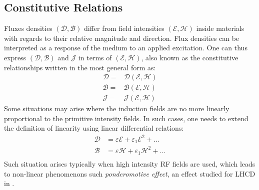 \subsection{Constitutive Relations}
Fluxes densities $(\boldsymbol{\mathcal{D}}, \boldsymbol{\mathcal{B}})$ differ from field intensities $(\boldsymbol{\mathcal{E}}, \boldsymbol{\mathcal{H}})$ inside materials with regards to their relative magnitude and direction. Flux densities can be interpreted  as a response of the medium to an applied excitation. One can thus express $(\boldsymbol{\mathcal{D}},\boldsymbol{\mathcal{B}})$ and $\boldsymbol{\mathcal{J}}$ in terms of $(\boldsymbol{\mathcal{E}},\boldsymbol{\mathcal{H}})$, also known as the constitutive relationships written in the most general form as:
\begin{subequations}
	\begin{align}
		\boldsymbol{\mathcal{D}} =& \boldsymbol{\mathcal{D}}(\boldsymbol{\mathcal{E}},\boldsymbol{\mathcal{H}}) \\
		\boldsymbol{\mathcal{B}} =& \boldsymbol{\mathcal{B}}(\boldsymbol{\mathcal{E}},\boldsymbol{\mathcal{H}}) \\
		\boldsymbol{\mathcal{J}} =& \boldsymbol{\mathcal{J}}(\boldsymbol{\mathcal{E}},\boldsymbol{\mathcal{H}})
	\end{align}
\end{subequations}
Some situations may arise where the induction fields are no more linearly proportional to the primitive intensity fields. In such cases, one needs to extend the definition of linearity using linear differential relations:
\begin{subequations}
	\begin{align}
		\boldsymbol{\mathcal{D}} &= \varepsilon \boldsymbol{\mathcal{E}} + \varepsilon_1 \boldsymbol{\mathcal{E}}^2  + \ldots \\
		\boldsymbol{\mathcal{B}} &= \varepsilon \boldsymbol{\mathcal{H}} + \varepsilon_1 \boldsymbol{\mathcal{H}}^2 + \ldots \\
	\end{align}
\end{subequations}
Such situation arises typically when high intensity RF fields are used, which leads to non-linear phenomenons such \emph{ponderomotive effect}, an effect studied for LHCD in .



